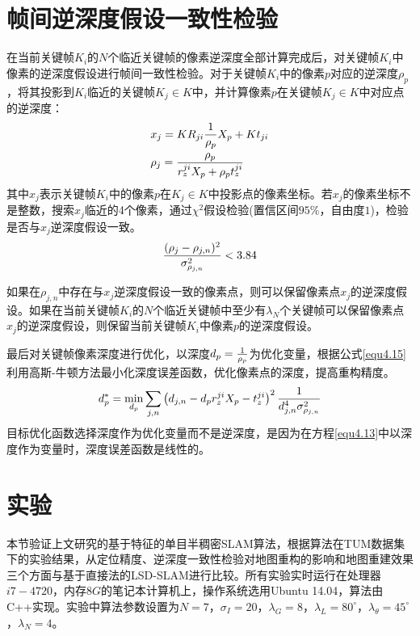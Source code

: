 \section{帧间逆深度假设一致性检验}
在当前关键帧$K_i$的$N$个临近关键帧的像素逆深度全部计算完成后，对关键帧$K_i$中像素的逆深度假设进行帧间一致性检验。对于关键帧$K_i$中的像素$p$对应的逆深度$\rho_p$，将其投影到$K_i$临近的关键帧$K_j \in K$中，并计算像素$p$在关键帧$K_j \in K$中对应点的逆深度：
\begin{equation}
\label{equ4.13}
\begin{aligned}
& x_j = K R_{ji} {1 \over \rho_p} X_p + Kt_{ji} \\ 
& \rho_j = { \rho_p \over r_z^{ji}X_p+\rho_p t_z^{ji} }
\end{aligned}
\end{equation}
其中$x_{j}$表示关键帧$K_i$中的像素$p$在$K_j \in K$中投影点的像素坐标。若$x_j$的像素坐标不是整数，搜索$x_{j}$临近的4个像素，通过$\chi^2$假设检验(置信区间$95\%$，自由度$1$)，检验是否与$x_j$逆深度假设一致。
\begin{equation}
\label{equ4.14}
{ (\rho_j - \rho_{j,n})^2 \over \sigma_{\rho_{j,n}}^2 } < 3.84
\end{equation}

如果在$\rho_{j,n}$中存在与$x_j$逆深度假设一致的像素点，则可以保留像素点$x_j$的逆深度假设。如果在当前关键帧$K_i$的$N$个临近关键帧中至少有$\lambda_N$个关键帧可以保留像素点$x_j$的逆深度假设，则保留当前关键帧$K_i$中像素$p$的逆深度假设。

最后对关键帧像素深度进行优化，以深度$d_p = { 1 \over \rho_p }$为优化变量，根据公式\eqref{equ4.15}利用高斯-牛顿方法最小化深度误差函数，优化像素点的深度，提高重构精度。
\begin{equation}
\label{equ4.15}
d_p^* = \min_{d_p} \sum\limits_{j,n} \left( d_{j,n} - d_p r_z^{ji} X_p - t_z^{ji}  \right)^2  {1 \over {d_{j,n}^4 \sigma_{\rho_{j,n}}^2 }}
\end{equation}
目标优化函数选择深度作为优化变量而不是逆深度，是因为在方程\eqref{equ4.13}中以深度作为变量时，深度误差函数是线性的。


\section{实验}
本节验证上文研究的基于特征的单目半稠密SLAM算法，根据算法在TUM数据集下的实验结果，从定位精度、逆深度一致性检验对地图重构的影响和地图重建效果三个方面与基于直接法的LSD-SLAM进行比较。所有实验实时运行在处理器$i7-4720$，内存$8G$的笔记本计算机上，操作系统选用Ubuntu 14.04，算法由C++实现。实验中算法参数设置为$N=7$，$\sigma_I=20$，$\lambda_G=8$，$\lambda_L = 80^\circ$，$\lambda_\theta=45^\circ$，$\lambda_N=4$。


